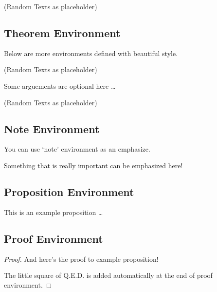 \documentclass[12pt]{article}
\begin{document}
    \begin{solution}
        (Random Texts as placeholder) \lipsum[65] %

    \end{solution}

    \subsection{Theorem Environment}

    Below are more environments defined with beautiful style.

    \begin{theorem}
        (Random Texts as placeholder) \lipsum[66]
    \end{theorem}

    Some arguements are optional here \dots

    \begin{theorem}[]
        (Random Texts as placeholder) \lipsum[75]
    \end{theorem}

    \subsection{Note Environment}

    You can use `note' environment as an emphasize.

    \begin{note}
        Something that is really important can be emphasized here!
    \end{note}

    \subsection{Proposition Environment}
    \begin{proposition}
        This is an example proposition \dots
    \end{proposition}

    \subsection{Proof Environment}

    \begin{proof}
        And here's the proof to example proposition!

        The little square of Q.E.D. is added automatically at the end of proof environment.

    \end{proof}
\end{document}
